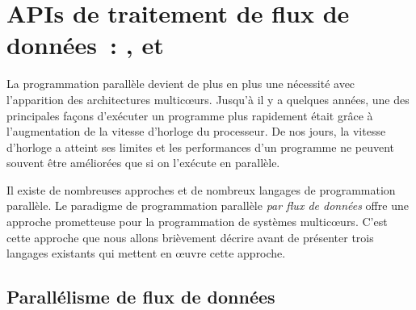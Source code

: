 
\chapter{APIs de traitement de flux de donn\'ees~: ,  et }
\label{outils_connus}
\label{outils_connus.chap}










La programmation parall\`ele devient de plus en plus une n\'ecessit\'e avec l'apparition des architectures multicœurs. Jusqu'\`a il y a quelques ann\'ees, une des principales fa\c{c}ons d'ex\'ecuter un programme plus rapidement \'etait gr\^ace \`a l'augmentation de la vitesse d'horloge du processeur. De nos jours, la vitesse d'horloge a atteint ses limites et les performances d'un programme ne peuvent souvent \^etre am\'elior\'ees que si on l'ex\'ecute en parall\`ele. 

Il existe de nombreuses approches et de nombreux langages de programmation parall\`ele.
%
Le paradigme de programmation parall\`ele \emph{par flux de donn\'ees} offre une approche prometteuse pour la programmation de syst\`emes multicœurs. C'est cette approche que nous allons bri\`evement d\'ecrire avant de pr\'esenter trois langages existants qui mettent en \oe{}uvre cette approche.

\section{Parall\'elisme de flux de donn\'ees}

